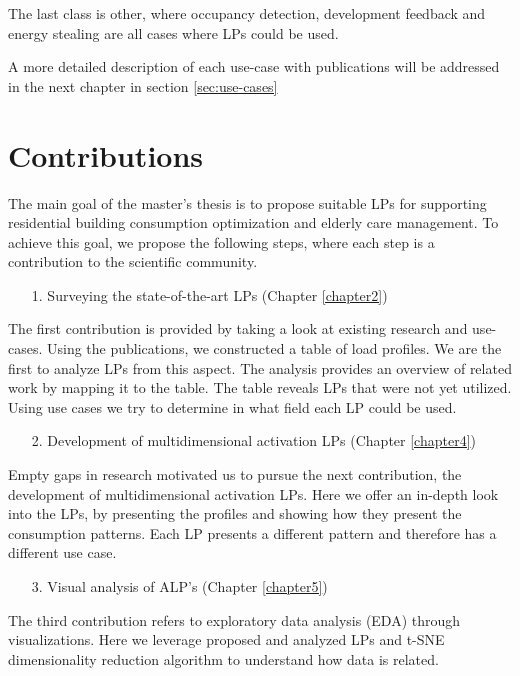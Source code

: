 The last class is other, where occupancy detection, development feedback and energy stealing are all cases where LPs could be used. 

A more detailed description of each use-case with publications will be addressed in the next chapter in section \ref{sec:use-cases}

\section{Contributions}
\label{sec:contributions} 

The main goal of the master's thesis is to propose suitable LPs for supporting residential building consumption optimization and elderly care management.
To achieve this goal, we propose the following steps, where each step is a contribution to the scientific community.

\begin{enumerate}
	\item[1.] Surveying the state-of-the-art LPs (Chapter \ref{chapter2})
\end{enumerate}

The first contribution is provided by taking a look at existing research and use-cases. 
Using the publications, we constructed a table of load profiles.
We are the first to analyze LPs from this aspect. 
The analysis provides an overview of related work by mapping it to the table.
The table reveals LPs that were not yet utilized.
Using use cases we try to determine in what field each LP could be used.

\begin{enumerate}
	\item[2.] Development of multidimensional activation LPs (Chapter \ref{chapter4})
\end{enumerate}
Empty gaps in research motivated us to pursue the next contribution, 
the development of multidimensional activation LPs. 
Here we offer an in-depth look into the LPs, by presenting the profiles and showing how they present the consumption patterns.
Each LP presents a different pattern and therefore has a different use case. 

\begin{enumerate}
	\item[3.] Visual analysis of ALP's (Chapter \ref{chapter5})
\end{enumerate}
The third contribution refers to exploratory data analysis (EDA) through visualizations.
Here we leverage proposed and analyzed LPs and t-SNE dimensionality reduction algorithm to understand how data is related.

